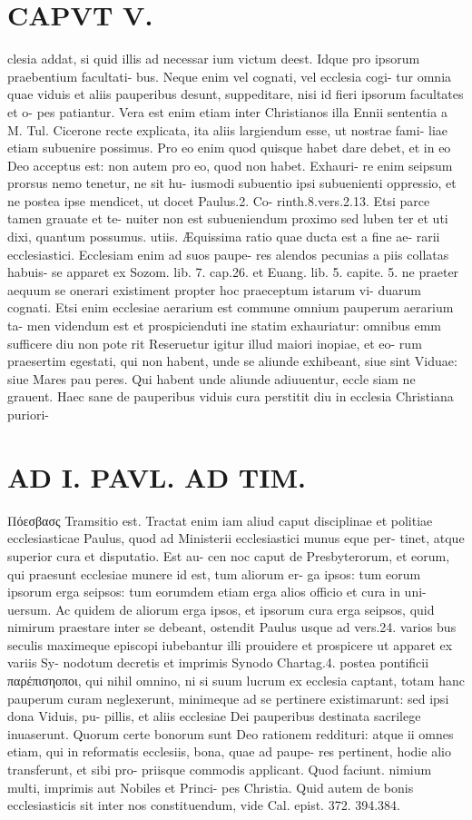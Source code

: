 \documentclass{article}
\begin{document}
\begin{pages}
\section*{CAPVT  V. }
\marginpar{[ p.303 ]}clesia addat, si quid illis ad necessar ium victum deest. Idque pro ipsorum praebentium facultati- bus. Neque enim vel cognati, vel ecclesia cogi- tur omnia quae viduis et aliis pauperibus desunt, suppeditare, nisi id fieri ipsorum facultates et o- pes patiantur. Vera est enim etiam inter Christianos illa Ennii sententia a M. Tul. Cicerone recte explicata, ita aliis largiendum esse, ut nostrae fami- liae etiam subuenire possimus. Pro eo enim quod quisque habet dare debet, et in eo Deo acceptus est: non autem pro eo, quod non habet. Exhauri- re enim seipsum prorsus nemo tenetur, ne sit hu- iusmodi subuentio ipsi subuenienti oppressio, et ne postea ipse mendicet, ut docet Paulus.2. Co- rinth.8.vers.2.13. Etsi parce tamen grauate et te- nuiter non est subueniendum proximo sed luben ter et uti dixi, quantum possumus. utiis. Æquissima ratio quae ducta est a fine ae- rarii ecclesiastici. Ecclesiam enim ad suos paupe- res alendos pecunias a piis collatas habuis- se apparet ex Sozom. lib. 7. cap.26. et Euang. lib. 5. capite. 5. ne praeter aequum se onerari existiment propter hoc praeceptum istarum vi- duarum cognati. Etsi enim ecclesiae aerarium est commune omnium pauperum aerarium ta- men videndum est et prospicienduti ine statim exhauriatur: omnibus emm sufficere diu non pote rit Reseruetur igitur illud maiori inopiae, et eo- rum praesertim egestati, qui non habent, unde se aliunde exhibeant, siue sint Viduae: siue Mares pau peres. Qui habent unde aliunde adiuuentur, eccle siam ne grauent. Haec sane de pauperibus viduis cura perstitit diu in ecclesia Christiana puriori- 
\section*{AD I. PAVL. AD TIM. }
\marginpar{[ p.304 ]}   Πόεσβασς Tramsitio est. Tractat enim iam aliud caput disciplinae et politiae ecclesiasticae Paulus, quod ad Ministerii ecclesiastici munus eque per- tinet, atque superior cura et disputatio. Est au- cen noc caput de Presbyterorum, et eorum, qui praesunt ecclesiae munere id est, tum aliorum er- ga ipsos: tum eorum ipsorum erga seipsos: tum eorumdem etiam erga alios officio et cura in uni- uersum. Ac quidem de aliorum erga ipsos, et ipsorum cura erga seipsos, quid nimirum praestare inter se debeant, ostendit Paulus usque ad vers.24. varios bus seculis maximeque episcopi iubebantur illi prouidere et prospicere ut apparet ex variis Sy- nodotum decretis et imprimis Synodo Chartag.4. postea pontificii παρέπισηοποι, qui nihil omnino, ni si suum lucrum ex ecclesia captant, totam hanc pauperum curam neglexerunt, minimeque ad se pertinere existimarunt: sed ipsi dona Viduis, pu- pillis, et aliis ecclesiae Dei pauperibus destinata sacrilege inuaserunt. Quorum certe bonorum sunt Deo rationem reddituri: atque ii omnes etiam, qui in reformatis ecclesiis, bona, quae ad paupe- res pertinent, hodie alio transferunt, et sibi pro- priisque commodis applicant. Quod faciunt. nimium multi, imprimis aut Nobiles et Princi- pes Christia. Quid autem de bonis ecclesiasticis sit inter nos constituendum, vide Cal. epist. 372. 394.384. 

\end{pages}
\end{document}
